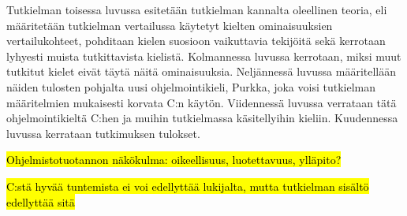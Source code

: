 
%


Tutkielman toisessa luvussa esitetään tutkielman kannalta oleellinen
teoria, eli määritetään tutkielman vertailussa käytetyt kielten ominaisuuksien
vertailukohteet, pohditaan kielen suosioon vaikuttavia tekijöitä sekä kerrotaan
lyhyesti muista tutkittavista kielistä. Kolmannessa luvussa kerrotaan, miksi
muut tutkitut kielet eivät täytä näitä ominaisuuksia. Neljännessä luvussa
määritellään näiden tulosten pohjalta uusi ohjelmointikieli, Purkka, joka voisi
tutkielman määritelmien mukaisesti korvata C:n käytön. Viidennessä luvussa
verrataan tätä ohjelmointikieltä C:hen ja muihin tutkielmassa käsitellyihin
kieliin. Kuudennessa luvussa kerrataan tutkimuksen tulokset.

\hl{Ohjelmistotuotannon näkökulma: oikeellisuus, luotettavuus, ylläpito?}

\hl{C:stä hyvää tuntemista ei voi edellyttää lukijalta, mutta tutkielman
sisältö edellyttää sitä}
